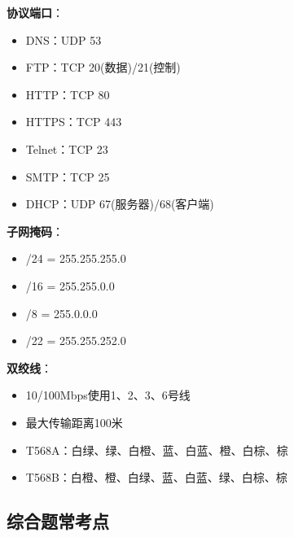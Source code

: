 \documentclass[12pt,a4paper]{ctexart}
\begin{document}
\begin{keybox}
\textbf{协议端口}：
\begin{itemize}[itemsep=0pt]
    \item DNS：UDP 53
    \item FTP：TCP 20(数据)/21(控制)
    \item HTTP：TCP 80
    \item HTTPS：TCP 443
    \item Telnet：TCP 23
    \item SMTP：TCP 25
    \item DHCP：UDP 67(服务器)/68(客户端)
\end{itemize}

\textbf{子网掩码}：
\begin{itemize}[itemsep=0pt]
    \item /24 = 255.255.255.0
    \item /16 = 255.255.0.0
    \item /8 = 255.0.0.0
    \item /22 = 255.255.252.0
\end{itemize}

\textbf{双绞线}：
\begin{itemize}[itemsep=0pt]
    \item 10/100Mbps使用1、2、3、6号线
    \item 最大传输距离100米
    \item T568A：白绿、绿、白橙、蓝、白蓝、橙、白棕、棕
    \item T568B：白橙、橙、白绿、蓝、白蓝、绿、白棕、棕
\end{itemize}
\end{keybox}

\subsection{综合题常考点}
\end{document}
